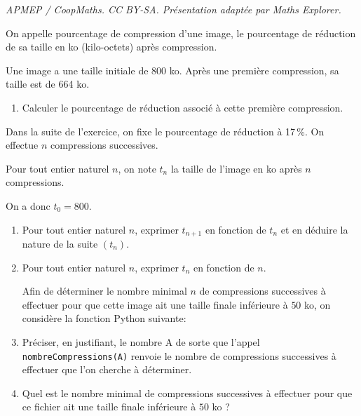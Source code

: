 \documentclass[10pt]{article}
\begin{document}
\noindent\textit{APMEP / CoopMaths. CC BY-SA. Présentation adaptée par Maths Explorer.}\par\medskip
\medskip

On appelle pourcentage de compression d'une image, le pourcentage de réduction de sa taille en ko (kilo-octets) après compression.

Une image a une taille initiale de 800 ko. Après une première compression, sa taille est de 664 ko.

\medskip

\begin{enumerate}
\item Calculer le pourcentage de réduction associé à cette première compression.
\end{enumerate}

Dans la suite de l'exercice, on fixe le pourcentage de réduction à 17\,\%. On effectue $n$ compressions successives.

Pour tout entier naturel $n$, on note $t_n$ la taille de l'image en ko après $n$ compressions.

On a donc $t_0 = 800$.
\begin{enumerate}[resume]
\item  Pour tout entier naturel $n$, exprimer $t_{n+1}$ en fonction de $t_n$ et en déduire la nature de la suite $\left(t_n\right)$.
\item  Pour tout entier naturel $n$, exprimer $t_n$  en fonction de $n$.

Afin de déterminer le nombre minimal $n$ de compressions successives à effectuer pour que cette image ait une taille finale inférieure à $50$ ko, on considère la fonction Python suivante:

\begin{center}
\end{center}

\item Préciser, en justifiant, le nombre A de sorte que l'appel \texttt{nombreCompressions(A)} renvoie le nombre de compressions successives à effectuer que l'on cherche à déterminer.
\item Quel est le nombre minimal de compressions successives à effectuer pour que ce fichier ait une taille finale inférieure à $50$ ko ?
\end{enumerate}

\bigskip
\end{document}
